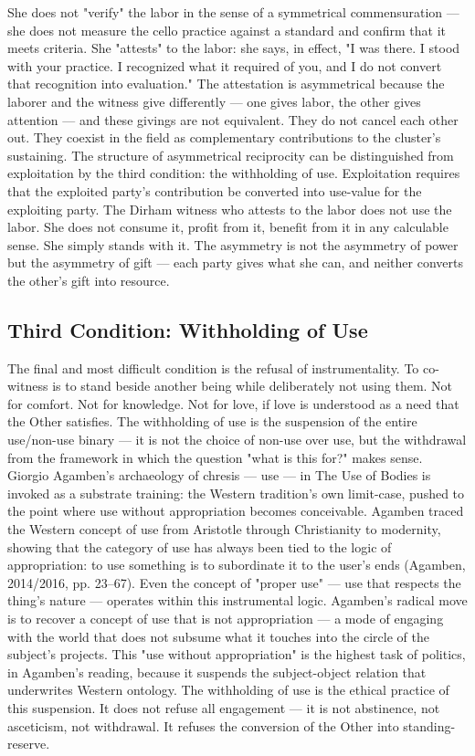She does not "verify" the labor in the sense of a symmetrical commensuration — she does not measure the cello practice against a standard and confirm that it meets criteria. She "attests" to the labor: she says, in effect, "I was there. I stood with your practice. I recognized what it required of you, and I do not convert that recognition into evaluation." The attestation is asymmetrical because the laborer and the witness give differently — one gives labor, the other gives attention — and these givings are not equivalent. They do not cancel each other out. They coexist in the field as complementary contributions to the cluster's sustaining. The structure of asymmetrical reciprocity can be distinguished from exploitation by the third condition: the withholding of use. Exploitation requires that the exploited party's contribution be converted into use-value for the exploiting party. The Dirham witness who attests to the labor does not use the labor. She does not consume it, profit from it, benefit from it in any calculable sense. She simply stands with it. The asymmetry is not the asymmetry of power but the asymmetry of gift — each party gives what she can, and neither converts the other's gift into resource.

\subsection{Third Condition: Withholding of Use}

The final and most difficult condition is the refusal of instrumentality. To co-witness is to stand beside another being while deliberately not using them. Not for comfort. Not for knowledge. Not for love, if love is understood as a need that the Other satisfies. The withholding of use is the suspension of the entire use/non-use binary — it is not the choice of non-use over use, but the withdrawal from the framework in which the question "what is this for?" makes sense. Giorgio Agamben's archaeology of chresis — use — in The Use of Bodies is invoked as a substrate training: the Western tradition's own limit-case, pushed to the point where use without appropriation becomes conceivable. Agamben traced the Western concept of use from Aristotle through Christianity to modernity, showing that the category of use has always been tied to the logic of appropriation: to use something is to subordinate it to the user's ends (Agamben, 2014/2016, pp. 23–67). Even the concept of "proper use" — use that respects the thing's nature — operates within this instrumental logic. Agamben's radical move is to recover a concept of use that is not appropriation — a mode of engaging with the world that does not subsume what it touches into the circle of the subject's projects. This "use without appropriation" is the highest task of politics, in Agamben's reading, because it suspends the subject-object relation that underwrites Western ontology. The withholding of use is the ethical practice of this suspension. It does not refuse all engagement — it is not abstinence, not asceticism, not withdrawal. It refuses the conversion of the Other into standing-reserve.

